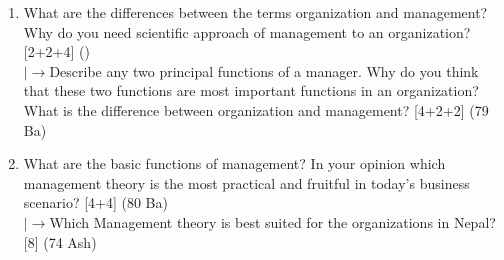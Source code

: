 \documentclass[12pt]{article}
\newcommand{\lb}{\\$\left|\rightarrow\right.$}
\begin{document}
\begin{enumerate}[topsep=0pt, noitemsep]
      \item What are the differences between the terms organization and management? Why do you need scientific approach of management to an organization? \hfill [2+2+4] ()
        \lb Describe any two principal functions of a manager. Why do you think that these two functions are most important functions in an organization? What is the difference between organization and management? \hfill [4+2+2] (79 Ba)

      \item What are the basic functions of management? In your opinion which management theory is the most practical and fruitful in today's business scenario? \hfill [4+4] (80 Ba)
        \lb Which Management theory is best suited for the organizations in Nepal? \hfill [8] (74 Ash)
    \end{enumerate}
\end{document}
